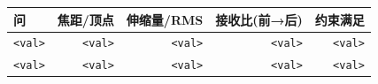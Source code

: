 \begin{tabular}{lrrrr}
\toprule
\textbf{问} & \textbf{焦距/顶点} & \textbf{伸缩量/RMS} & \textbf{接收比(前→后)} & \textbf{约束满足} \\\midrule
\texttt{<val>} & \texttt{<val>} & \texttt{<val>} & \texttt{<val>} & \texttt{<val>} \\
\texttt{<val>} & \texttt{<val>} & \texttt{<val>} & \texttt{<val>} & \texttt{<val>} \\\bottomrule
\end{tabular}
